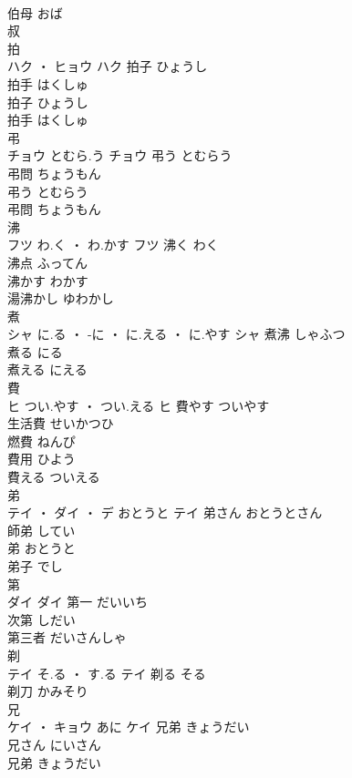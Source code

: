 \documentclass[8pt]{extreport}
\begin{document}
\begin{CJK}{UTF8}{min}
\\	伯母	おば	
\\	叔 
\\	拍	
\\	ハク ・ ヒョウ		ハク	拍子	ひょうし	
\\	拍手	はくしゅ	
\\	拍子	ひょうし	
\\	拍手	はくしゅ	
\\	弔	
\\	チョウ	とむら.う	チョウ	弔う	とむらう	
\\	弔問	ちょうもん	
\\	弔う	とむらう	
\\	弔問	ちょうもん	
\\	沸	
\\	フツ	わ.く ・ わ.かす	フツ	沸く	わく	
\\	沸点	ふってん	
\\	沸かす	わかす	
\\	湯沸かし	ゆわかし	
\\	煮	
\\	シャ	に.る ・ -に ・ に.える ・ に.やす	シャ	煮沸	しゃふつ	
\\	煮る	にる	
\\	煮える	にえる	
\\	費	
\\	ヒ	つい.やす ・ つい.える	ヒ	費やす	ついやす	
\\	生活費	せいかつひ	
\\	燃費	ねんぴ	
\\	費用	ひよう	
\\	費える	ついえる	
\\	弟	
\\	テイ ・ ダイ ・ デ	おとうと	テイ	弟さん	おとうとさん	
\\	師弟	してい	
\\	弟	おとうと	
\\	弟子	でし	
\\	第	
\\	ダイ		ダイ	第一	だいいち	
\\	次第	しだい	
\\	第三者	だいさんしゃ	
\\	剃	
\\	テイ	そ.る ・ す.る	テイ	剃る	そる	
\\	剃刀	かみそり	
\\	兄	
\\	ケイ ・ キョウ	あに	ケイ	兄弟	きょうだい	
\\	兄さん	にいさん	
\\	兄弟	きょうだい	

\end{CJK}
\end{document}
